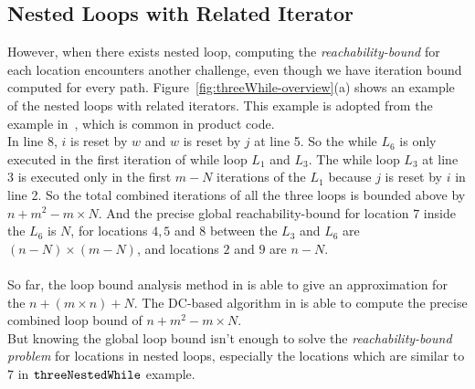 \subsection{Nested Loops with Related Iterator}
\label{sec:overview-nestedwhile}
However, when there exists nested loop, computing the \emph{reachability-bound} for each location encounters another challenge, even though we have
iteration bound computed for every path.
Figure~\ref{fig:threeWhile-overview}(a) shows an example of the nested loops with related 
iterators.
This example is adopted from the example in~\cite{GulwaniJK09}, which is common in product code.
\\
In line 8, $i$ is reset by $w$ and $w$ is reset by $j$ at line 5. So the
while $L_6$ is only executed in the first iteration of while loop $L_1$ and $L_3$.
The while loop $L_3$ at line 3 is executed only in 
the first $m - N$ iterations of the 
$L_1$ because $j$ is reset by $i$ in line 2.
So the total combined iterations of all the three loops is bounded above by 
$n + m^2 - m \times N$.
And the precise global reachability-bound for location $7$ inside the $L_6$ is $N$,
for locations $4, 5$ and $8$ between the $L_3$ and $L_6$ are $(n-N) \times (m - N)$,
and locations $2$ and $9$ are $n - N$.
\\
\\
So far, the loop bound analysis method in \cite{GulwaniJK09} is able to give
an approximation for the $n + (m \times n) + N$. 
The DC-based algorithm in \cite{sinn2017complexity} is able to
compute the precise combined loop bound of $n + m^2 - m \times N$.
\\
But knowing the global loop bound isn't enough to solve the \emph{reachability-bound problem} for locations in nested loops,
especially the locations which are similar to $7$ in $\mathtt{threeNestedWhile}$ example.
\\
